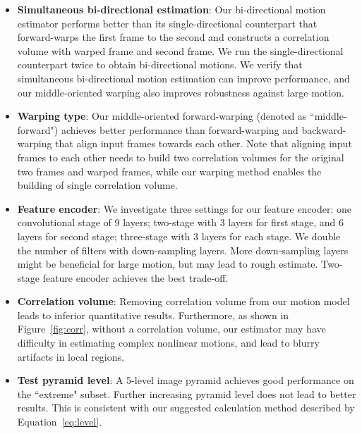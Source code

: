 \documentclass[10pt,twocolumn,letterpaper]{article}
\begin{document}
\begin{itemize}
    \item \textbf{Simultaneous bi-directional estimation}: Our bi-directional
        motion estimator performs better than its single-directional counterpart
        that forward-warps the first frame to the second and constructs a
        correlation volume with warped frame and second frame.  We run the
        single-directional counterpart twice to obtain bi-directional motions.
        We verify that simultaneous bi-directional motion estimation can improve
        performance, and our middle-oriented warping also improves robustness
        against large motion.
    \item \textbf{Warping type}: Our middle-oriented forward-warping (denoted as
        ``middle-forward") achieves better performance than forward-warping and
        backward-warping that align input frames towards each other. Note that
        aligning input frames to each other needs to build two correlation
        volumes for the original two frames and warped frames, while our warping
        method enables the building of single correlation volume.
    \item \textbf{Feature encoder}: We investigate three settings for our
        feature encoder: one convolutional stage of 9 layers; two-stage with 3
        layers for first stage, and 6 layers for second stage; three-stage with
        3 layers for each stage. We double the number of filters with
        down-sampling layers. More down-sampling layers might be beneficial for
        large motion, but may lead to rough estimate. Two-stage feature encoder
        achieves the best trade-off.
    \item \textbf{Correlation volume}: Removing correlation volume from our
        motion model leads to inferior quantitative results.  Furthermore, as
        shown in Figure~\ref{fig:corr}, without a correlation
        volume, our estimator may have difficulty in estimating complex
        nonlinear motions, and lead to blurry artifacts in local regions.

\item \textbf{Test pyramid level}: A 5-level image pyramid achieves good
        performance on the ``extreme" subset. Further increasing pyramid level
        does not lead to better results. This is consistent with our suggested
        calculation method described by Equation~\ref{eq:level}.
\end{itemize}
\end{document}
